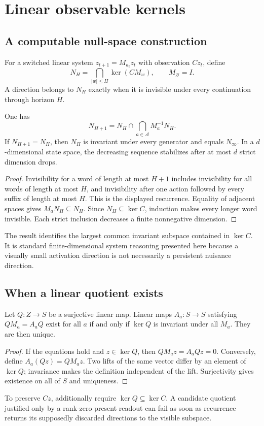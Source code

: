 \documentclass[11pt]{article}
\begin{document}
\section{Linear observable kernels}
\subsection{A computable null-space construction}
For a switched linear system \(z_{t+1}=M_{a_t}z_t\) with observation \(Cz_t\), define
\[
 N_H=\bigcap_{|w|\le H}\ker(CM_w),\qquad M_\varnothing=I.
\]
A direction belongs to \(N_H\) exactly when it is invisible under every continuation through horizon \(H\).

\begin{proposition}\label{prop:kernel}
One has
\[
 N_{H+1}=N_H\cap\bigcap_{a\in\mathcal A}M_a^{-1}N_H.
\]
If \(N_{H+1}=N_H\), then \(N_H\) is invariant under every generator and equals \(N_\infty\). In a \(d\)-dimensional state space, the decreasing sequence stabilizes after at most \(d\) strict dimension drops.
\end{proposition}
\begin{proof}
Invisibility for a word of length at most \(H+1\) includes invisibility for all words of length at most \(H\), and invisibility after one action followed by every suffix of length at most \(H\). This is the displayed recurrence. Equality of adjacent spaces gives \(M_aN_H\subseteq N_H\). Since \(N_H\subseteq\ker C\), induction makes every longer word invisible. Each strict inclusion decreases a finite nonnegative dimension.
\end{proof}
The result identifies the largest common invariant subspace contained in \(\ker C\). It is standard finite-dimensional system reasoning presented here because a visually small activation direction is not necessarily a persistent nuisance direction.

\subsection{When a linear quotient exists}
\begin{proposition}\label{prop:quotient}
Let \(Q:Z\to S\) be a surjective linear map. Linear maps \(A_a:S\to S\) satisfying \(QM_a=A_aQ\) exist for all \(a\) if and only if \(\ker Q\) is invariant under all \(M_a\). They are then unique.
\end{proposition}
\begin{proof}
If the equations hold and \(z\in\ker Q\), then \(QM_az=A_aQz=0\). Conversely, define \(A_a(Qz)=QM_az\). Two lifts of the same vector differ by an element of \(\ker Q\); invariance makes the definition independent of the lift. Surjectivity gives existence on all of \(S\) and uniqueness.
\end{proof}
To preserve \(Cz\), additionally require \(\ker Q\subseteq\ker C\). A candidate quotient justified only by a rank-zero present readout can fail as soon as recurrence returns its supposedly discarded directions to the visible subspace.
\end{document}
